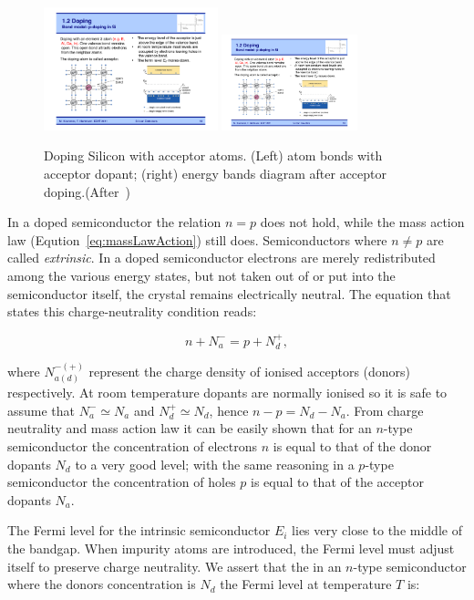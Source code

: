  \begin{figure}[htbp]
   \centering
   \includegraphics[width=0.45\textwidth]{pDopingBonds.pdf} 
   \includegraphics[width=0.35\textwidth]{pDopingBands.pdf} 
   \caption{\label{fig:pDoping}Doping Silicon with acceptor atoms. (Left) atom bonds with acceptor 
   dopant; (right) energy bands diagram after acceptor doping.(After~\cite{Krammer})}
\end{figure}
In a doped semiconductor the relation $n=p$ does not hold, while the mass action law  
(Eqution~\ref{eq:massLawAction}) still does. Semiconductors where $n\neq p$ are called
 {\it extrinsic}.
In a doped semiconductor electrons are merely redistributed among the various energy states, 
but not taken out of or put into the semiconductor itself, the crystal remains electrically neutral. 
The equation that states this charge-neutrality condition reads:

\begin{equation}
n+N_a^-=p+N_d^+,
\label{eq:chargeNeutrality}
\end{equation}

where $N_{a(d)}^{-(+)}$ represent the charge density of ionised acceptors (donors) respectively. 
At room temperature dopants are normally ionised so it is safe to assume that $N_a^-\simeq N_a$ 
and $N_d^+\simeq N_d$, hence $n-p=N_d-N_a$. From charge neutrality and mass action law  
it can be easily shown that for an $n$-type semiconductor the concentration of electrons $n$ is 
equal to that of the donor dopants $N_d$ to a very good level; with the same reasoning in a 
$p$-type semiconductor the concentration of holes $p$ is equal to that of the acceptor 
dopants $N_a$. 

The Fermi level for the intrinsic semiconductor $E_i$ lies very close to the middle of the bandgap.
 When 
impurity atoms are introduced, the Fermi level must adjust itself to preserve charge neutrality. 
We assert that the in an $n$-type semiconductor where the donors concentration is $N_d$ the 
Fermi level at temperature $T$ is:

